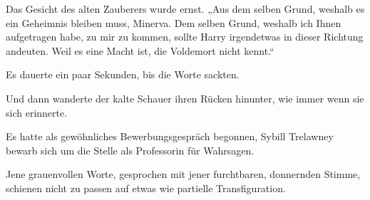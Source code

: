 Das Gesicht des alten Zauberers wurde ernst. „Aus dem selben Grund, weshalb es ein Geheimnis bleiben muss, Minerva. Dem selben Grund, weshalb ich Ihnen aufgetragen habe, zu mir zu kommen, sollte Harry irgendetwas in dieser Richtung andeuten. Weil es eine Macht ist, die Voldemort nicht kennt.“

Es dauerte ein paar Sekunden, bis die Worte sackten.

Und dann wanderte der kalte Schauer ihren Rücken hinunter, wie immer wenn sie sich erinnerte.

Es hatte als gewöhnliches Bewerbungsgespräch begonnen, Sybill Trelawney bewarb sich um die Stelle als Professorin für Wahrsagen.


Jene grauenvollen Worte, gesprochen mit jener furchtbaren, donnernden Stimme, schienen nicht zu passen auf etwas wie partielle Transfiguration.

